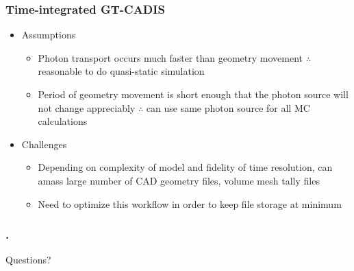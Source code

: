 \documentclass{beamer}
\begin{document}
\begin{frame}
	\frametitle{Time-integrated GT-CADIS}
	\begin{itemize}
		\item{Assumptions}
			\begin{itemize}
				\item{Photon transport occurs much faster than
					geometry movement $\therefore$
					reasonable to do quasi-static
					simulation}
				\item{Period of geometry movement is short
					enough that the photon source will not
					change appreciably $\therefore$ can use
					same photon source for all MC
					calculations}
			\end{itemize}
		\item{Challenges}
			\begin{itemize}
				\item{Depending on complexity of model and
					fidelity of time resolution, can amass
					large number of CAD geometry files,
					volume mesh tally files}
				\item{Need to optimize this workflow in order
					to keep file storage at minimum}
			\end{itemize}
	\end{itemize}
	
\end{frame}

\begin{frame}[c]
	\frametitle{\tiny{.}}
	\begin{center}
	{\Huge Questions?}
	\end{center}
\end{frame}
\end{document}
